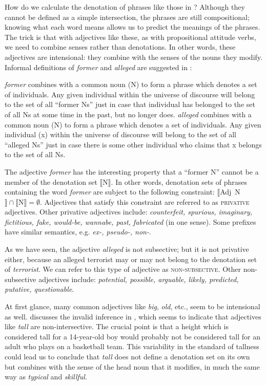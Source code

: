 How do we calculate the denotation of phrases like those in ? Although they cannot be defined as a simple intersection, the phrases are still compositional; knowing what each word means allows us to predict the meanings of the phrases. The trick is that with adjectives like these, as with propositional attitude verbs, we need to combine senses rather than denotations. In other words, these adjectives are intensional: they combine with the senses of the nouns they modify. Informal definitions of \textit{former} and \textit{alleged} are suggested in :


\ea \label{ex:15.11}
\ea   \textit{former} combines with a common noun (N) to form a phrase which denotes a set of individuals. Any given individual within the universe of discourse will belong to the set of all “former Ns” just in case that individual has belonged to the set of all Ns at some time in the past, but no longer does.
\ex  \textit{alleged} combines with a common noun (N) to form a phrase which denotes a set of individuals. Any given individual (x) within the universe of discourse will belong to the set of all “alleged Ns” just in case there is some other individual who claims that x belongs to the set of all Ns.
\z \z


The adjective \textit{former} has the interesting property that a “former N” cannot be a member of the denotation set $\llbracket$N$\rrbracket$. In other words, denotation sets of phrases containing the word \textit{former} are subject to the following constraint: $\llbracket$Adj~N$\rrbracket \cap \llbracket \text{N} \rrbracket  = \emptyset$. Adjectives that satisfy this constraint are referred to as \textsc{privative} adjectives. Other privative adjectives include: \textit{counterfeit, spurious, imaginary, fictitious, fake, would-be, wannabe, past, fabricated} (in one sense). Some prefixes have similar semantics, e.g. \textit{ex-, pseudo-, non-}.



As we have seen, the adjective \textit{alleged} is not subsective; but it is not privative either, because an alleged terrorist may or may not belong to the denotation set of \textit{terrorist}. We can refer to this type of adjective as \textsc{non-subsective}. Other non-subsective adjectives include: \textit{potential, possible, arguable, likely, predicted, putative, questionable}.



At first glance, many common adjectives like \textit{big}, \textit{old}, etc., seem to be intensional as well. \citet{Partee1995} discusses the invalid inference in , which seems to indicate that adjectives like \textit{tall} are non-intersective. The crucial point is that a height which is considered tall for a 14-year-old boy would probably not be considered tall for an adult who plays on a basketball team. This variability in the standard of tallness could lead us to conclude that \textit{tall} does not define a denotation set on its own but combines with the sense of the head noun that it modifies, in much the same way as \textit{typical} and \textit{skillful}.


